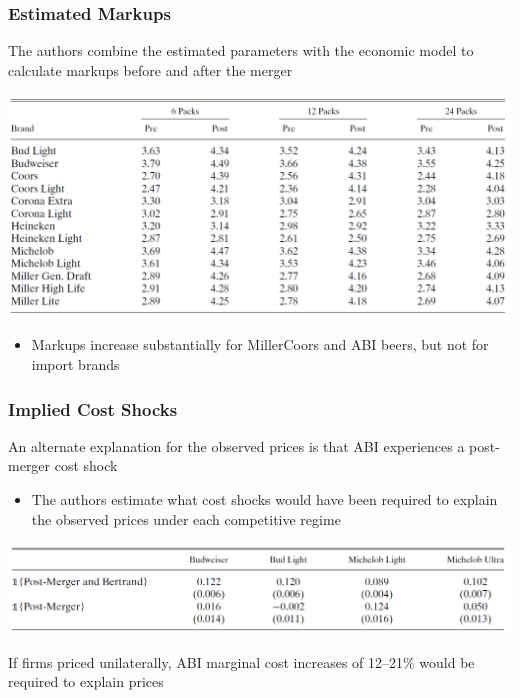 \documentclass{beamer}
\begin{document}
\begin{frame}\frametitle{Estimated Markups}
    The authors combine the estimated parameters with the economic model to calculate markups before and after the merger
    \begin{center}
        \includegraphics[width=0.95\linewidth]{table_7}
    \end{center}
    \begin{itemize}
        \item Markups increase substantially for MillerCoors and ABI beers, but not for import brands
    \end{itemize}    
\end{frame}

\begin{frame}\frametitle{Implied Cost Shocks}
    An alternate explanation for the observed prices is that ABI experiences a post-merger cost shock
    \begin{itemize}
        \item The authors estimate what cost shocks would have been required to explain the observed prices under each competitive regime
    \end{itemize}
    \begin{center}
        \includegraphics[width=0.95\linewidth]{table_8}
    \end{center}
    If firms priced unilaterally, ABI marginal cost increases of 12--21\% would be required to explain prices
    \
\end{frame}
\end{document}

